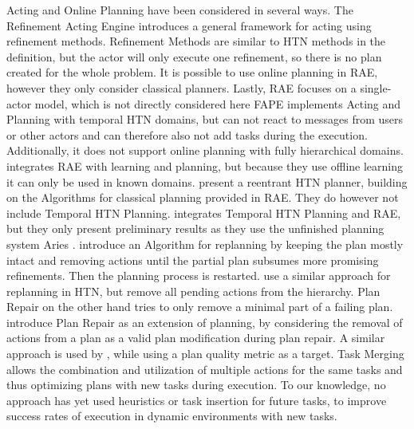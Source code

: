Acting and Online Planning have been considered in several ways.
The Refinement Acting Engine \citep{ghallabAutomatedPlanningActing2016} introduces a general framework for acting using refinement methods.
Refinement Methods are similar to HTN methods in the definition, but the actor will only execute one refinement, so there is no plan created for the whole problem.
It is possible to use online planning in RAE, however they only consider classical planners. 
Lastly, RAE focuses on a single-actor model, which is not directly considered here
FAPE \citep{bit-monnotTemporalHierarchicalModels2016a} implements Acting and Planning with temporal HTN domains, but can not react to messages from users or other actors and can therefore also not add tasks during the execution.
Additionally, it does not support online planning with fully hierarchical domains.
\cite{patraIntegratingActingPlanning2020} integrates RAE with learning and planning, but because they use offline learning it can only be used in known domains.
\cite{bansodIntegratingPlanningActing2021} present a reentrant HTN planner, building on the Algorithms for classical planning provided in RAE.
They do however not include Temporal HTN Planning.
\cite{turiGuidanceRefinementbasedActing2022} integrates Temporal HTN Planning and RAE, but they only present preliminary results as they use the unfinished planning system Aries \citep{bit-monnotAries2024}.
\cite{boellaReplanningAlgorithmReactive2002} introduce an Algorithm for replanning by keeping the plan mostly intact and removing actions until the partial plan subsumes more promising refinements. Then the planning process is restarted.
\cite{bansodHTNReplanningMiddle2022} use a similar approach for replanning in HTN, but remove all pending actions from the hierarchy.
Plan Repair on the other hand tries to only remove a minimal part of a failing plan.
\cite{vanderkrogtPlanRepairExtension2005} introduce Plan Repair as an extension of planning, by considering the removal of actions from a plan as a valid plan modification during plan repair.
A similar approach is used by \cite{bajadaTemporalPlanQuality2014}, while using a plan quality metric as a target.
Task Merging \citep{stockOnlineTaskMerging2015} allows the combination and utilization of multiple actions for the same tasks and thus optimizing plans with new tasks during execution.
To our knowledge, no approach has yet used heuristics or task insertion for future tasks, to improve success rates of execution in dynamic environments with new tasks.
